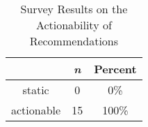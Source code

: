 \begin{table}[htbp]
    \centering
    \caption{Survey Results on the Actionability of Recommendations}
    \begin{tabular}{|c|c|c|} \hline
          & \textbf{\em n} & \textbf{Percent}\\ \hline
         static & 0 & 0\% \\ \hline
         actionable & 15 & 100\% \\ \hline
    \end{tabular}
    \label{tab:results}
\end{table}